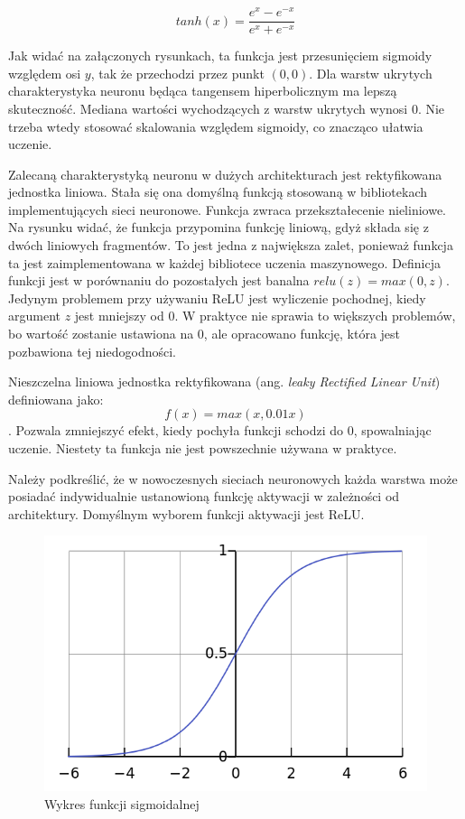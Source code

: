 \documentclass[12pt,a4paper,twoside,titlepage,openright]{book}
\begin{document}
$$tanh(x) = \frac{e^{x} - e^{-x}}{e^{x} + e^{-x}}$$

Jak widać na załączonych rysunkach, ta funkcja jest przesunięciem sigmoidy względem osi \(y\), tak że przechodzi przez punkt \((0,0)\). Dla warstw ukrytych charakterystyka neuronu będąca tangensem hiperbolicznym ma lepszą skuteczność. Mediana wartości wychodzących z warstw ukrytych wynosi 0. Nie trzeba wtedy stosować skalowania względem sigmoidy, co znacząco ułatwia uczenie.

Zalecaną charakterystyką neuronu w dużych architekturach jest rektyfikowana jednostka liniowa. Stała się ona domyślną funkcją stosowaną w bibliotekach implementujących sieci neuronowe. Funkcja zwraca przekształecenie nieliniowe. Na rysunku widać, że funkcja przypomina funkcję liniową, gdyż składa się z dwóch liniowych fragmentów. To jest jedna z największa zalet, ponieważ funkcja ta jest zaimplementowana w każdej bibliotece uczenia maszynowego. Definicja funkcji jest w porównaniu do pozostałych jest banalna \(relu(z) = max(0,z)\). Jedynym problemem przy używaniu ReLU jest wyliczenie pochodnej, kiedy argument \(z\) jest mniejszy od 0. W praktyce nie sprawia to większych problemów, bo wartość zostanie ustawiona na 0, ale opracowano funkcję, która jest pozbawiona tej niedogodności.

Nieszczelna liniowa jednostka rektyfikowana (ang. \textit{leaky Rectified Linear Unit}) definiowana jako: $$f(x) = max(x, 0.01x)$$. Pozwala zmniejszyć efekt, kiedy pochyła funkcji schodzi do 0, spowalniając uczenie. Niestety ta funkcja nie jest powszechnie używana w praktyce.

Należy podkreślić, że w nowoczesnych sieciach neuronowych każda warstwa może posiadać indywidualnie ustanowioną funkcję aktywacji w zależności od architektury. Domyślnym wyborem funkcji aktywacji jest ReLU. 

\begin{figure}[ht]
	\centering
			\includegraphics[resolution=100, scale=0.7]{Sigmoid.png}
		\caption{Wykres funkcji sigmoidalnej}
\end{figure}
\end{document}
